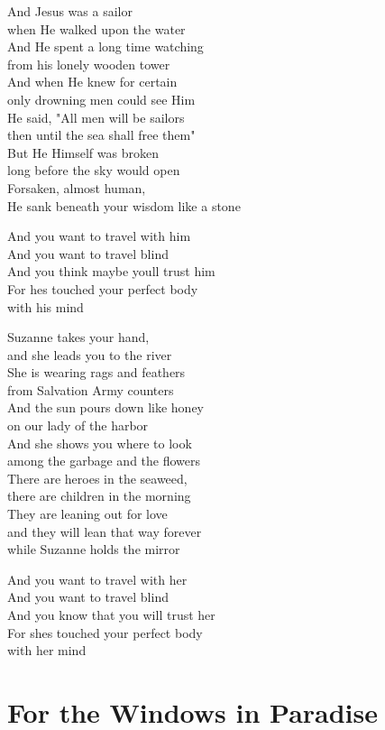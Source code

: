 \documentclass[
  letterpaper,
  twoside=false]{scrbook}
\begin{document}
And Jesus was a sailor\\
when He walked upon the water\\
And He spent a long time watching\\
from his lonely wooden tower\\
And when He knew for certain\\
only drowning men could see Him\\
He said, "All men will be sailors\\
then until the sea shall free them"\\
But He Himself was broken\\
long before the sky would open\\
Forsaken, almost human,\\
He sank beneath your wisdom like a stone

And you want to travel with him\\
And you want to travel blind\\
And you think maybe you\textquotesingle ll trust him\\
For he\textquotesingle s touched your perfect body\\
with his mind

Suzanne takes your hand,\\
and she leads you to the river ~\\
She is wearing rags and feathers\\
from Salvation Army counters\\
And the sun pours down like honey\\
on our lady of the harbor\\
And she shows you where to look\\
among the garbage and the flowers\\
There are heroes in the seaweed,\\
there are children in the morning ~ ~\\
They are leaning out for love\\
and they will lean that way forever ~\\
while Suzanne holds the mirror

And you want to travel with her\\
And you want to travel blind\\
And you know that you will trust her\\
For she\textquotesingle s touched your perfect body\\
with her mind

\hypertarget{for-the-windows-in-paradise}{%
\chapter{For the Windows in
Paradise}\label{for-the-windows-in-paradise}}
\end{document}
